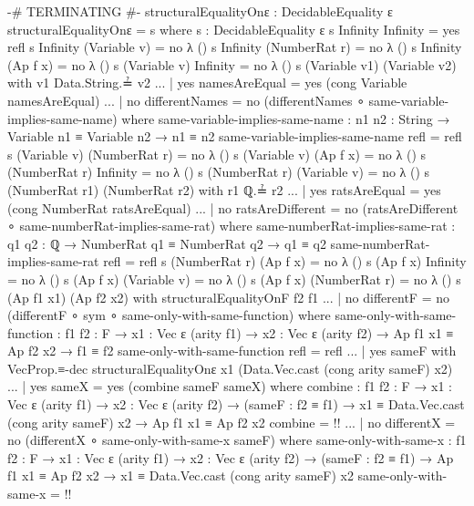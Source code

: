 \documentclass{report}
\begin{document}
\begin{code}
  {-# TERMINATING #-}
  structuralEqualityOnε : DecidableEquality ε
  structuralEqualityOnε = s
    where
    s : DecidableEquality ε
    s Infinity Infinity = yes refl
    s Infinity (Variable v) = no λ ()
    s Infinity (NumberRat r) = no λ ()
    s Infinity (Ap f x) = no λ ()
    s (Variable v) Infinity = no λ ()
    s (Variable v1) (Variable v2) with v1 Data.String.≟ v2
    ... | yes namesAreEqual = yes (cong Variable namesAreEqual)
    ... | no differentNames = no (differentNames ∘ same-variable-implies-same-name)
      where
      same-variable-implies-same-name :
        {n1 n2 : String} →
        Variable n1 ≡ Variable n2 →
        n1 ≡ n2
      same-variable-implies-same-name refl = refl
    s (Variable v) (NumberRat r) = no λ ()
    s (Variable v) (Ap f x) = no λ ()
    s (NumberRat r) Infinity = no λ ()
    s (NumberRat r) (Variable v) = no λ ()
    s (NumberRat r1) (NumberRat r2) with r1 ℚ.≟ r2
    ... | yes ratsAreEqual = yes (cong NumberRat ratsAreEqual)
    ... | no ratsAreDifferent = no (ratsAreDifferent ∘ same-numberRat-implies-same-rat)
      where
      same-numberRat-implies-same-rat :
        {q1 q2 : ℚ} →
        NumberRat q1 ≡ NumberRat q2 →
        q1 ≡ q2
      same-numberRat-implies-same-rat refl = refl
    s (NumberRat r) (Ap f x) = no λ ()
    s (Ap f x) Infinity = no λ ()
    s (Ap f x) (Variable v) = no λ ()
    s (Ap f x) (NumberRat r) = no λ ()
    s (Ap f1 x1) (Ap f2 x2) with structuralEqualityOnF f2 f1
    ... | no differentF = no (differentF ∘ sym ∘ same-only-with-same-function)
      where
      same-only-with-same-function :
        {f1 f2 : F} →
        {x1 : Vec ε (arity f1)} →
        {x2 : Vec ε (arity f2)} →
        Ap f1 x1 ≡ Ap f2 x2 →
        f1 ≡ f2
      same-only-with-same-function refl = refl
    ... | yes sameF with VecProp.≡-dec structuralEqualityOnε
                                       x1 (Data.Vec.cast (cong arity sameF) x2)
    ... | yes sameX = yes (combine sameF sameX)
      where
      combine :
        {f1 f2 : F} →
        {x1 : Vec ε (arity f1)} →
        {x2 : Vec ε (arity f2)} →
        (sameF : f2 ≡ f1) →
        x1 ≡ Data.Vec.cast (cong arity sameF) x2 →
        Ap f1 x1 ≡ Ap f2 x2
      combine = {!!}
    ... | no differentX = no (differentX ∘ same-only-with-same-x sameF)
      where
      same-only-with-same-x :
        {f1 f2 : F} →
        {x1 : Vec ε (arity f1)} →
        {x2 : Vec ε (arity f2)} →
        (sameF : f2 ≡ f1) →
        Ap f1 x1 ≡ Ap f2 x2 →
        x1 ≡ Data.Vec.cast (cong arity sameF) x2
      same-only-with-same-x = {!!}
\end{code}
\end{document}
